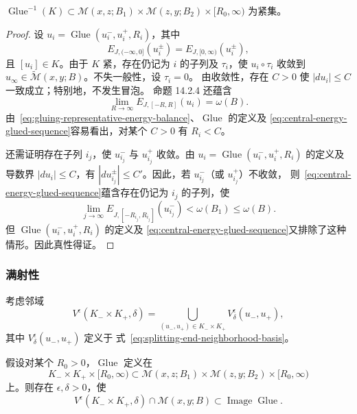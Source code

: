 \begin{proposition}
\label{prop:glue-properness}
$\operatorname{Glue}^{-1}(K)\subset
\mathcal M(x,z;B_1)\times\mathcal M(z,y;B_2)\times[R_0,\infty)$ 为紧集。
\end{proposition}

\begin{proof}
设 $u_i=\operatorname{Glue}(u_i^-,u_i^+,R_i)$，其中
\begin{equation}
 E_{J,(-\infty,0]}(u_i^\pm)=E_{J,[0,\infty)}(u_i^\pm),
 \label{eq:gluing-representative-energy-balance}
\end{equation}
且 $[u_i]\in K$。由于 $K$ 紧，存在仍记为 $i$ 的子列及 $\tau_i$，使
$u_i\circ\tau_i$ 收敛到
$u_\infty\in\widetilde{\mathcal M}(x,y;B)$。不失一般性，设 $\tau_i=0$。
由收敛性，存在 $C>0$ 使 $|du_i|\leq C$ 一致成立；特别地，不发生冒泡。
命题 14.2.4 还蕴含
\begin{equation}
 \lim_{R\to\infty}E_{J,[-R,R]}(u_i)=\omega(B).
 \label{eq:central-energy-glued-sequence}
\end{equation}
由~\eqref{eq:gluing-representative-energy-balance}、$\operatorname{Glue}$ 的定义及
\eqref{eq:central-energy-glued-sequence}容易看出，对某个 $C>0$ 有 $R_i<C$。

还需证明存在子列 $i_j$，使 $u_{i_j}^-$ 与 $u_{i_j}^+$ 收敛。由
$u_i=\operatorname{Glue}(u_i^-,u_i^+,R_i)$ 的定义及导数界 $|du_i|\leq C$，有
$|du_{i_j}^\pm|\leq C'$。因此，若 $u_{i_j}^-$（或 $u_{i_j}^+$）不收敛，
则~\eqref{eq:central-energy-glued-sequence}蕴含存在仍记为 $i_j$ 的子列，使
\[
 \lim_{j\to\infty}E_{J,[-R_{i_j},R_{i_j}]}(u_{i_j}^-)
 <\omega(B_1)\leq\omega(B).
\]
但 $\operatorname{Glue}(u_i^-,u_i^+,R_i)$ 的定义及
\eqref{eq:central-energy-glued-sequence}又排除了这种情形。因此真性得证。
\end{proof}

\subsubsection*{满射性}
考虑邻域
\[
 V^\epsilon(K_-\times K_+,\delta)
 =\bigcup_{(u_-,u_+)\in K_-\times K_+}V_\delta^\epsilon(u_-,u_+),
\]
其中 $V_\delta^\epsilon(u_-,u_+)$ 定义于
式~\eqref{eq:splitting-end-neighborhood-basis}。

\begin{proposition}
\label{prop:glue-surjectivity-near-boundary}
假设对某个 $R_0>0$，$\operatorname{Glue}$ 定义在
\[
 K_-\times K_+\times[R_0,\infty)
 \subset\mathcal M(x,z;B_1)\times\mathcal M(z,y;B_2)\times[R_0,\infty)
\]
上。则存在 $\epsilon,\delta>0$，使
\[
 V^\epsilon(K_-\times K_+,\delta)\cap\mathcal M(x,y;B)
 \subset\operatorname{Image}\operatorname{Glue}.
\]
\end{proposition}

